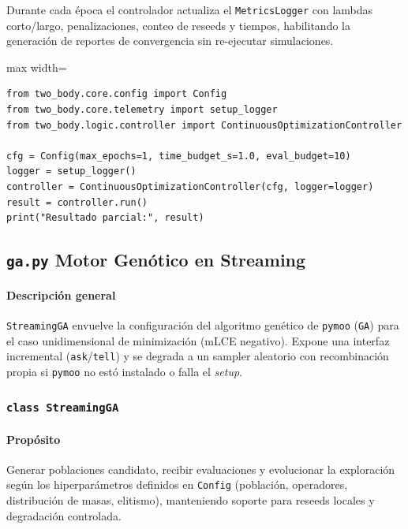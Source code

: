 Durante cada época el controlador actualiza el \texttt{MetricsLogger} con lambdas corto/largo, penalizaciones, conteo de reseeds y tiempos, habilitando la generación de reportes de convergencia sin re-ejecutar simulaciones.



\begin{listing}[H]
\caption{Ejemplo de uso de \texttt{ContinuousOptimizationController}}
\begin{adjustbox}{max width=\textwidth}
\begin{minipage}{\textwidth}
\begin{verbatim}
from two_body.core.config import Config
from two_body.core.telemetry import setup_logger
from two_body.logic.controller import ContinuousOptimizationController

cfg = Config(max_epochs=1, time_budget_s=1.0, eval_budget=10)
logger = setup_logger()
controller = ContinuousOptimizationController(cfg, logger=logger)
result = controller.run()
print("Resultado parcial:", result)
\end{verbatim}
\end{minipage}
\end{adjustbox}
\end{listing}

\subsection{\texttt{ga.py} \- Motor Genótico en Streaming}
\paragraph{Descripción general}
\texttt{StreamingGA} envuelve la configuración del algoritmo genético de \texttt{pymoo} (\texttt{GA}) para el caso unidimensional de minimización (mLCE negativo). Expone una interfaz incremental (\texttt{ask}/\texttt{tell}) y se degrada a un sampler aleatorio con recombinación propia si \texttt{pymoo} no estó instalado o falla el \emph{setup}.

\subsubsection{\texttt{class StreamingGA}}
\paragraph{Propósito} Generar poblaciones candidato, recibir evaluaciones y evolucionar la exploración según los hiperparámetros definidos en \texttt{Config} (población, operadores, distribución de masas, elitismo), manteniendo soporte para reseeds locales y degradación controlada.


